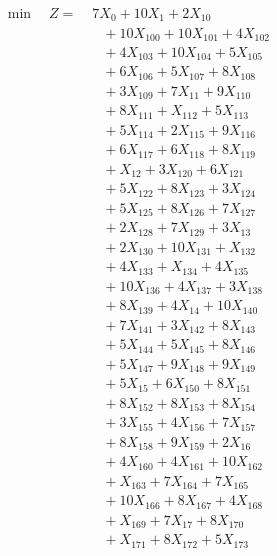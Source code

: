 \documentclass[a4paper,10pt]{article}
\begin{document}
\allowdisplaybreaks
{\small
\begin{align}
\min \quad Z = &\; 7X_{0} + 10X_{1} + 2X_{10} \\[0.5ex]
&\quad  + 10X_{100} + 10X_{101} + 4X_{102} \\[0.5ex]
&\quad  + 4X_{103} + 10X_{104} + 5X_{105} \\[0.5ex]
&\quad  + 6X_{106} + 5X_{107} + 8X_{108} \\[0.5ex]
&\quad  + 3X_{109} + 7X_{11} + 9X_{110} \\[0.5ex]
&\quad  + 8X_{111} + X_{112} + 5X_{113} \\[0.5ex]
&\quad  + 5X_{114} + 2X_{115} + 9X_{116} \\[0.5ex]
&\quad  + 6X_{117} + 6X_{118} + 8X_{119} \\[0.5ex]
&\quad  + X_{12} + 3X_{120} + 6X_{121} \\[0.5ex]
&\quad  + 5X_{122} + 8X_{123} + 3X_{124} \\[0.5ex]
&\quad  + 5X_{125} + 8X_{126} + 7X_{127} \\[0.5ex]
&\quad  + 2X_{128} + 7X_{129} + 3X_{13} \\[0.5ex]
&\quad  + 2X_{130} + 10X_{131} + X_{132} \\[0.5ex]
&\quad  + 4X_{133} + X_{134} + 4X_{135} \\[0.5ex]
&\quad  + 10X_{136} + 4X_{137} + 3X_{138} \\[0.5ex]
&\quad  + 8X_{139} + 4X_{14} + 10X_{140} \\[0.5ex]
&\quad  + 7X_{141} + 3X_{142} + 8X_{143} \\[0.5ex]
&\quad  + 5X_{144} + 5X_{145} + 8X_{146} \\[0.5ex]
&\quad  + 5X_{147} + 9X_{148} + 9X_{149} \\[0.5ex]
&\quad  + 5X_{15} + 6X_{150} + 8X_{151} \\[0.5ex]
&\quad  + 8X_{152} + 8X_{153} + 8X_{154} \\[0.5ex]
&\quad  + 3X_{155} + 4X_{156} + 7X_{157} \\[0.5ex]
&\quad  + 8X_{158} + 9X_{159} + 2X_{16} \\[0.5ex]
&\quad  + 4X_{160} + 4X_{161} + 10X_{162} \\[0.5ex]
&\quad  + X_{163} + 7X_{164} + 7X_{165} \\[0.5ex]
&\quad  + 10X_{166} + 8X_{167} + 4X_{168} \\[0.5ex]
&\quad  + X_{169} + 7X_{17} + 8X_{170} \\[0.5ex]
&\quad  + X_{171} + 8X_{172} + 5X_{173} \\[0.5ex]

\end{align}}
\end{document}
